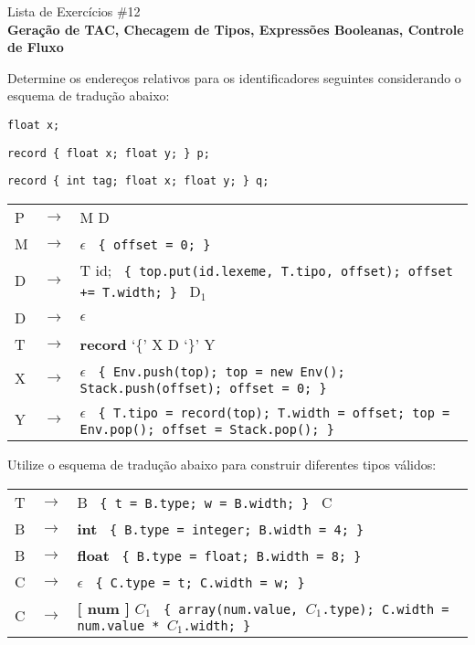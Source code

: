 \documentclass{compiladores}
\begin{document}
\begin{center}
{\LARGE Lista de Exercícios \#12}\\
{\bf Geração de TAC, Checagem de Tipos, Expressões Booleanas, Controle de Fluxo}
\end{center}

\bigskip

\begin{listanumerada}
\item Determine os endereços relativos para os identificadores seguintes considerando o esquema de tradução abaixo:
  \begin{lista}
  \item \texttt{float x;}
  \item \texttt{record \{ float x; float y; \} p;}
  \item \texttt{record \{ int tag; float x; float y; \} q;}
  \end{lista}

  \medskip

  \begin{tabular}{lll}
    P  &  $\rightarrow$  &  M D                                                    \\
    M  &  $\rightarrow$  &  $\epsilon$ \texttt { \{ offset = 0; \} }                           \\
    D  &  $\rightarrow$  &  T id; \texttt { \{ top.put(id.lexeme, T.tipo, offset);   offset += T.width; \} } D$_1$         \\
    D  &  $\rightarrow$  &  $\epsilon$                                             \\
    T  &  $\rightarrow$  &  \textbf{record} `\{' X D `\}' Y                        \\
    X  &  $\rightarrow$  &  $\epsilon$ \texttt{ \{ Env.push(top); top = new Env();   Stack.push(offset); offset = 0; \} }       \\
    Y  &  $\rightarrow$  &  $\epsilon$ \texttt{ \{ T.tipo = record(top); T.width = offset; top = Env.pop(); offset = Stack.pop(); \}  }\\
  \end{tabular}

\item Utilize o esquema de tradução abaixo para construir diferentes tipos válidos:

 \medskip

  \begin{tabular}{lll}
    T  &  $\rightarrow$  &  B \texttt{ \{ t = B.type; w = B.width; \} } C                        \\
    B  &  $\rightarrow$  &  \textbf{int} \texttt{ \{ B.type = integer; B.width = 4; \} }         \\
    B  &  $\rightarrow$  &  \textbf{float}  \texttt{ \{ B.type = float; B.width = 8; \} }        \\
    C  &  $\rightarrow$  &  $\epsilon$ \texttt{ \{ C.type = t; C.width = w; \} }                 \\
    C  &  $\rightarrow$  &  \textbf{[ num ]} $C_1$ \texttt{ \{ array(num.value, $C_1$.type); C.width = num.value * $C_1$.width; \} }\\
  \end{tabular}


\end{listanumerada}
\end{document}

